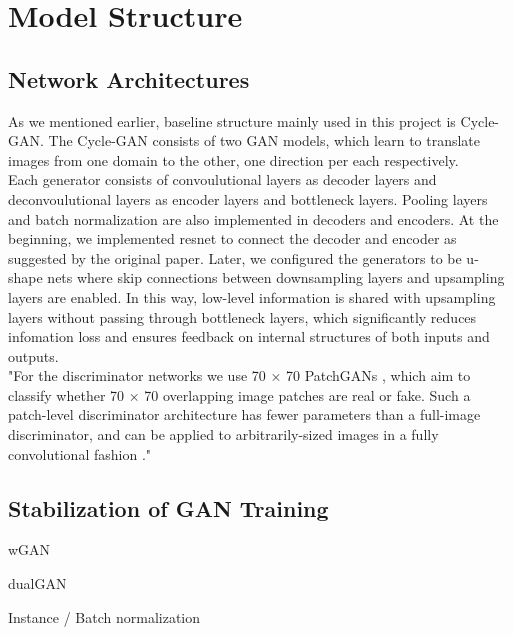 \chapter{Model Structure}\label{Ch:Result}

\section{Network Architectures}

As we mentioned earlier, baseline structure mainly used in this project is Cycle-GAN. The Cycle-GAN consists of two GAN models, which learn to translate images from one domain to the other, one direction per each respectively. 
\\
Each generator consists of convoulutional layers as decoder layers and deconvoulutional layers as encoder layers and bottleneck layers. Pooling layers and batch normalization are also implemented in
decoders and encoders. At the beginning, we implemented resnet to connect the decoder and encoder as suggested by the original paper. Later, we configured the generators
to be u-shape nets where skip connections between downsampling layers and upsampling layers are enabled. In this way, low-level information is shared with upsampling layers
without passing through bottleneck layers, which significantly reduces infomation loss and ensures feedback on internal structures of both inputs and outputs.
\\
"For the discriminator
networks we use 70 × 70 PatchGANs , which
aim to classify whether 70 × 70 overlapping image patches
are real or fake. Such a patch-level discriminator architecture
has fewer parameters than a full-image discriminator,
and can be applied to arbitrarily-sized images in a fully convolutional
fashion ."
\section{Stabilization of GAN Training}

wGAN

dualGAN

Instance / Batch normalization

\endinput


